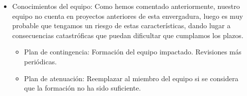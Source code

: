 \documentclass[a4paper,11pt]{report}
\begin{document}
\begin{itemize}
    \item Conocimientos del equipo: Como hemos comentado anteriormente, nuestro
    equipo no cuenta en proyectos anteriores de esta envergadura, luego es
    muy probable que tengamos un riesgo de estas características, dando lugar
    a consecuencias catastróficas que puedan dificultar que cumplamos los plazos.
    \begin{itemize}
        \item Plan de contingencia: Formación del equipo impactado.
        Revisiones más periódicas.
        \item Plan de atenuación: Reemplazar al miembro del equipo si se
        considera que la formación no ha sido suficiente.
    \end{itemize}

\end{itemize}
\end{document}

